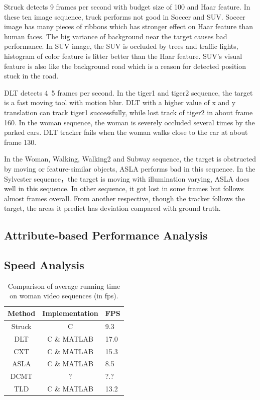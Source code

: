 \documentclass{acm_proc_article-sp}
\begin{document}
Struck detects 9 frames per second with budget size of 100 and Haar feature.
In these ten image sequence, truck performs not good in Soccer and SUV.
Soccer image has many pieces of ribbons which has stronger effect on Haar feature than human faces.
The big variance of background near the target causes bad performance.
In SUV image, the SUV is occluded by trees and traffic lights, histogram of color feature is litter better than the Haar feature.
SUV's visual feature is also like the background road which is a reason for detected position stuck in the road.

DLT detects 4~5 frames per second. In the tiger1 and tiger2 sequence, the target is a fast moving tool with motion blur. DLT with a higher value of x and y translation can track tiger1 successfully, while lost track of tiger2 in about frame 160. In the woman sequence, the woman is severely occluded several times by the parked cars. DLT tracker fails when the woman walks close to the car at about frame 130.

In the Woman, Walking, Walking2 and Subway sequence, the target is obstructed by moving or feature-similar objects, ASLA performs bad in this sequence. In the Sylvester sequence，the target is moving with illumination varying, ASLA does well in this sequence. In other sequence, it got lost in some frames but follows almost frames overall. From another respective,  though the tracker follows the target, the areas it predict has deviation compared with ground truth.

\subsection{Attribute-based Performance Analysis}

\subsection{Speed Analysis}

\begin{table}
	\centering
	\begin{tabular}{|c|c|l|} \hline
		Method & Implementation & FPS\\ \hline
		Struck & C & 9.3\\ \hline
		DLT & C \& MATLAB & 17.0\\ \hline
		CXT & C \& MATLAB & 15.3\\ \hline
		ASLA & C \& MATLAB & 8.5\\ \hline
		DCMT & ? & ?.?\\ \hline
		TLD & C \& MATLAB & 13.2\\ \hline
	\end{tabular}
	\caption{Comparison of average running time on woman video sequences (in fps).}
	\label{table:time}
\end{table}
\end{document}
